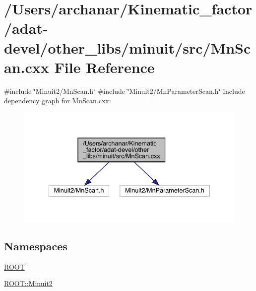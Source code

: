 \hypertarget{adat-devel_2other__libs_2minuit_2src_2MnScan_8cxx}{}\section{/\+Users/archanar/\+Kinematic\+\_\+factor/adat-\/devel/other\+\_\+libs/minuit/src/\+Mn\+Scan.cxx File Reference}
\label{adat-devel_2other__libs_2minuit_2src_2MnScan_8cxx}
{\ttfamily \#include \char`\"{}Minuit2/\+Mn\+Scan.\+h\char`\"{}}\newline
{\ttfamily \#include \char`\"{}Minuit2/\+Mn\+Parameter\+Scan.\+h\char`\"{}}\newline
Include dependency graph for Mn\+Scan.\+cxx\+:
\nopagebreak
\begin{figure}[H]
\begin{center}
\leavevmode
\includegraphics[width=336pt]{d3/ddc/adat-devel_2other__libs_2minuit_2src_2MnScan_8cxx__incl}
\end{center}
\end{figure}
\subsection*{Namespaces}
\begin{DoxyCompactItemize}
\item 
 \mbox{\hyperlink{namespaceROOT}{R\+O\+OT}}
\item 
 \mbox{\hyperlink{namespaceROOT_1_1Minuit2}{R\+O\+O\+T\+::\+Minuit2}}
\end{DoxyCompactItemize}
